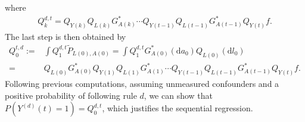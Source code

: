 \documentclass{article}
\newcommand{\A}[1]{A(#1)}
\renewcommand{\L}[1]{L(#1)}
\newcommand{\Y}[1]{Y(#1)}
\newcommand{\Ystar}[2]{Y^{(#1)}(#2)}
\renewcommand{\d}{\ensuremath{\mathrm{d}}}
\begin{document}
    where
    \begin{align*}
        Q_k^{d,t}=Q_{\Y{k}}Q_{\L{k}}G^*_{\A{k}}\cdots Q_{\Y{t-1}}Q_{\L{t-1}}G^*_{\A{t-1}}Q_{\Y{t}}f.
    \end{align*}
    The last step is then obtained by 
    \begin{align*}
        Q_0^{t,d}:=&\int Q_1^{d,t}\tilde{P}_{\L{0},\A{0}}=\int Q_1^{d,t}G^*_{\A{0}}(\d a_0)Q_{\L{0}}(\d l_0)\\
        =&Q_{\L{0}}G^*_{\A{0}}Q_{\Y{1}}Q_{\L{1}}G^*_{\A{1}}\cdots Q_{\Y{t-1}}Q_{\L{t-1}}G^*_{\A{t-1}}Q_{\Y{t}}f.
    \end{align*}
    Following previous computations, assuming unmeasured confounders and a positive probability of following rule $d$, we can show that $P(\Ystar{d}{t}=1)=Q_0^{d,t}$, which justifies the sequential regression.
\end{document}
